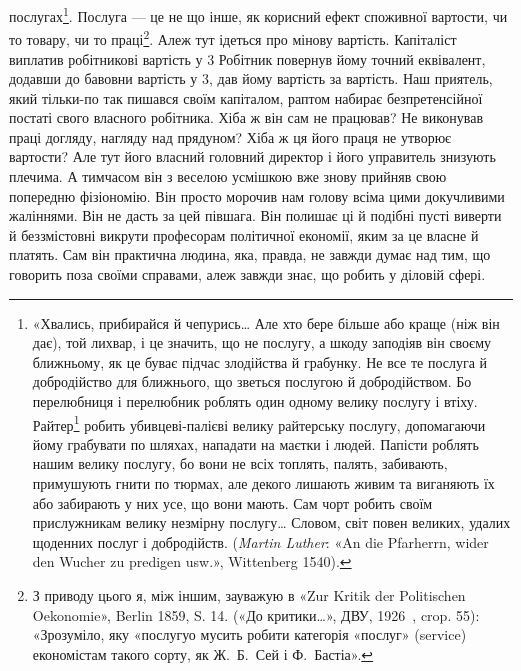 послугах\footnote{
«Хвались, прибирайся й чепурись\dots{} Але хто бере
більше або краще (ніж він дає), той лихвар, і це значить, що не послугу,
а шкоду заподіяв він своєму ближньому, як це буває підчас злодійства й грабунку.
Не все те послуга й добродійство для ближнього, що зветься послугою й
добродійством. Бо перелюбниця і перелюбник роблять один одному велику
послугу і втіху. Райтер\footnote*{
військовий, кінник. \emph{Ред.}
}
робить убивцеві-палієві велику райтерську
послугу, допомагаючи йому грабувати по шляхах, нападати на маєтки і
людей. Папісти роблять нашим велику послугу, бо вони не всіх топлять,
палять, забивають, примушують гнити по тюрмах, але декого лишають
живим та виганяють їх або забирають у них усе, що вони мають. Сам чорт
робить своїм прислужникам велику незмірну послугу\dots{} Словом, світ
повен великих, удалих щоденних послуг і добродійств. (\emph{Martin Luther}:
«An die Pfarherrn, wider den Wucher zu predigen usw.», Wittenberg 1540).
}. Послуга — це не що інше, як корисний ефект споживної
вартости, чи то товару, чи то праці\footnote{
З приводу цього я, між іншим, зауважую в «Zur Kritik der Politischen
Oekonomie», Berlin 1859, S. 14. («До критики\dots{}», ДВУ, 1926~,
crop. 55): «Зрозуміло, яку «послугуо мусить робити категорія «послуг»
(service) економістам такого сорту, як Ж.~Б.~Сей і Ф.~Бастіа».
}. Алеж тут ідеться
про мінову вартість. Капіталіст виплатив робітникові вартість
у 3 Робітник повернув йому точний еквівалент, додавши
до бавовни вартість у 3, дав йому вартість за вартість.
Наш приятель, який тільки-по так пишався своїм капіталом,
раптом набирає безпретенсійної постаті свого власного робітника.
Хіба ж він сам не працював? Не виконував праці догляду, нагляду
над прядуном? Хіба ж ця його праця не утворює вартости?
Але тут його власний головний директор і його управитель знизують
плечима. А тимчасом він з веселою усмішкою вже знову прийняв
свою попередню фізіономію. Він просто морочив нам голову
всіма цими докучливими жаліннями. Він не дасть за цей півшага.
Він полишає ці й подібні пусті виверти й беззмістовні викрути
професорам політичної економії, яким за це власне й платять.
Сам він практична людина, яка, правда, не завжди думає над тим,
що говорить поза своїми справами, алеж завжди знає, що робить
у діловій сфері.

